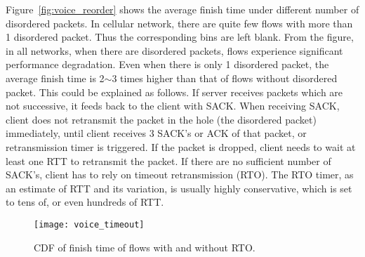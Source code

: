 Figure~\ref{fig:voice_reorder} shows the average finish time under different number of disordered packets. In cellular network, there are quite few flows with more than 1 disordered packet. Thus the corresponding bins are left blank. From the figure, in all networks, when there are disordered packets, flows experience significant performance degradation. Even when there is only 1 disordered packet, the average finish time is 2$\sim$3 times higher than that of flows without disordered packet. This could be explained as follows. If server receives packets which are not successive, it feeds back to the client with SACK. When receiving SACK, client does not retransmit the packet in the hole (\ie the disordered packet) immediately, until client receives 3 SACK's or ACK of that packet, or retransmission timer is triggered. If the packet is dropped, client needs to wait at least one RTT to retransmit the packet. If there are no sufficient number of SACK's, client has to rely on timeout retransmission (RTO). The RTO timer, as an estimate of RTT and its variation, is usually highly conservative, which is set to tens of, or even hundreds of RTT.



\begin{figure}[th]
\centering
	\texttt{[image: voice\_timeout]}
\caption{CDF of finish time of flows with and without RTO.}
\label{fig:voice_rto}
\end{figure}

